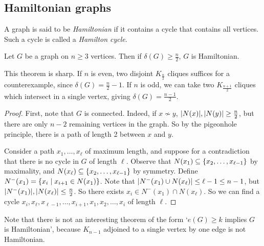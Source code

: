 \subsection{Hamiltonian graphs}
\begin{definition}
	A graph is said to be \emph{Hamiltonian} if it contains a cycle that contains all vertices.
	Such a cycle is called a \emph{Hamilton cycle}.
\end{definition}
\begin{theorem}
	Let \( G \) be a graph on \( n \geq 3 \) vertices.
	Then if \( \delta(G) \geq \frac{n}{2} \), \( G \) is Hamiltonian.
\end{theorem}
\begin{remark}
	This theorem is sharp.
	If \( n \) is even, two disjoint \( K_{\frac{n}{2}} \) cliques suffices for a counterexample, since \( \delta(G) = \frac{n}{2} - 1 \).
	If \( n \) is odd, we can take two \( K_{\frac{n+1}{2}} \) cliques which intersect in a single vertex, giving \( \delta(G) = \frac{n-1}{2} \).
\end{remark}
\begin{proof}
	First, note that \( G \) is connected.
	Indeed, if \( x \not\sim y \), \( \abs{N(x)}, \abs{N(y)} \geq \frac{n}{2} \), but there are only \( n - 2 \) remaining vertices in the graph.
	So by the pigeonhole principle, there is a path of length 2 between \( x \) and \( y \).

	Consider a path \( x_1, \dots, x_\ell \) of maximum length, and suppose for a contradiction that there is no cycle in \( G \) of length \( \ell \).
	Observe that \( N(x_1) \subseteq \qty{x_2, \dots, x_{\ell - 1}} \) by maximality, and \( N(x_\ell) \subseteq \qty{x_2, \dots, x_{\ell - 1}} \) by symmetry.
	Define \( N^-(x_1) = \qty{x_i \mid x_{i+1} \in N(x_1)} \).
	Note that \( \abs{N^-(x_1) \cup N(x_\ell)} \leq \ell - 1 \leq n - 1 \), but \( \abs{N^-(x_1)}, \abs{N(x_\ell)} \leq \frac{n}{2} \).
	So there exists \( x_i \in N^-(x_1) \cap N(x_\ell) \).
	So we can find a cycle \( x_i, x_\ell, x_{\ell-1}, \dots, x_{i+1}, x_1, x_2, \dots, x_i \) of length \( \ell \).
\end{proof}
\begin{remark}
	Note that there is not an interesting theorem of the form `\( e(G) \geq k \) implies \( G \) is Hamiltonian', because \( K_{n-1} \) adjoined to a single vertex by one edge is not Hamiltonian.
\end{remark}

